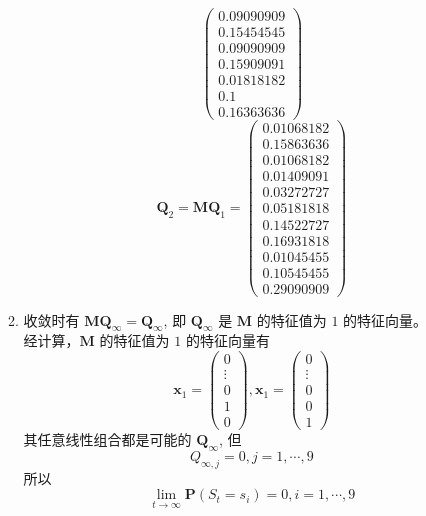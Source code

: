\documentclass[11pt,letter,notitlepage]{article}
\begin{document}
\begin{solution}
\begin{enumerate}
\begin{enumerate}
$$\begin{pmatrix}
					            0.09090909 \\
					            0.15454545 \\
					            0.09090909 \\
					            0.15909091 \\
					            0.01818182 \\
					            0.1        \\
					            0.16363636
				            \end{pmatrix}$$
			            $$\mathbf{Q}_2=\mathbf{M}\mathbf{Q}_1=\begin{pmatrix}
					            0.01068182 \\
					            0.15863636 \\
					            0.01068182 \\
					            0.01409091 \\
					            0.03272727 \\
					            0.05181818 \\
					            0.14522727 \\
					            0.16931818 \\
					            0.01045455 \\
					            0.10545455 \\
					            0.29090909
				            \end{pmatrix}$$
			      \item 收敛时有 $\mathbf{M}\mathbf{Q}_\infty=\mathbf{Q}_\infty$, 即 $\mathbf{Q}_\infty$ 是 $\mathbf{M}$ 的特征值为 $1$ 的特征向量。\\
			            经计算，$\mathbf{M}$ 的特征值为 $1$ 的特征向量有
			            $$\mathbf{x}_1=\begin{pmatrix}
					            0 \\ \vdots\\0\\1\\0
				            \end{pmatrix}, \mathbf{x}_1=\begin{pmatrix}
					            0 \\ \vdots\\0\\0\\1
				            \end{pmatrix}$$
			            其任意线性组合都是可能的 $\mathbf{Q}_\infty$, 但
			            $$Q_{\infty,j}=0, j=1,\cdots,9$$
			            所以 $$\lim_{t\rightarrow\infty} \mathbf{P}(S_t=s_i)=0,i=1,\cdots,9$$

\end{enumerate}
\end{enumerate}
\end{solution}
\end{document}
